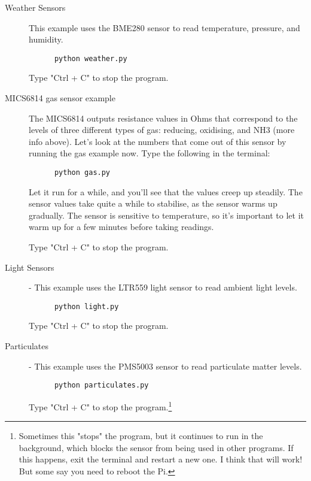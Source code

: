 \documentclass{article}
\begin{document}
\begin{description}
  \item[Weather Sensors] This example uses the BME280 sensor to read temperature, pressure, and humidity.
  
  \begin{verbatim}
      python weather.py
  \end{verbatim} 
  
  Type "Ctrl + C" to stop the program.
  
  \item[MICS6814 gas sensor example] The MICS6814 outputs resistance values in Ohms that correspond to the levels of three different types of gas: reducing, oxidising, and NH3 (more info above). Let's look at the numbers that come out of this sensor by running the gas example now. Type the following in the terminal:
  
  \begin{verbatim}
      python gas.py
  \end{verbatim}
  
Let it run for a while, and you'll see that the values creep up steadily. The sensor values take quite a while to stabilise, as the sensor warms up gradually. The sensor is sensitive to temperature, so it's important to let it warm up for a few minutes before taking readings.

Type "Ctrl + C" to stop the program.

\item[Light Sensors] - This example uses the LTR559 light sensor to read ambient light levels.

\begin{verbatim}
      python light.py
\end{verbatim}

Type "Ctrl + C" to stop the program.

\item[Particulates] - This example uses the PMS5003 sensor to read particulate matter levels.

\begin{verbatim}
      python particulates.py
\end{verbatim}

Type "Ctrl + C" to stop the program.\footnote{Sometimes this "stops" the program, but it continues to run in the background, which blocks the sensor from being used in other programs. If this happens, exit the terminal and restart a new one. I think that will work! But some say you need to reboot the Pi.}
  
\end{description}
\end{document}
